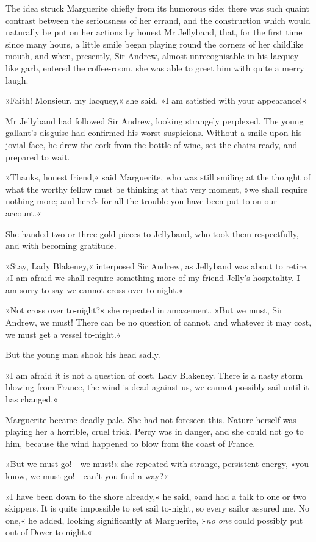 The idea struck Marguerite chiefly from its humorous side: there was such quaint contrast between the seriousness of her errand, and the construction which would naturally be put on her actions by honest Mr Jellyband, that, for the first time since many hours, a little smile began playing round the corners of her childlike mouth, and when, presently, Sir Andrew, almost unrecognisable in his lacquey-like garb, entered the coffee-room, she was able to greet him with quite a merry laugh.

»Faith! Monsieur, my lacquey,« she said, »I am satisfied with your appearance!«

Mr Jellyband had followed Sir Andrew, looking strangely perplexed. The young gallant's disguise had confirmed his worst suspicions. With\-out a smile upon his jovial face, he drew the cork from the bottle of wine, set the chairs ready, and prepared to wait.

»Thanks, honest friend,« said Marguerite, who was still smiling at the thought of what the worthy fellow must be thinking at that very moment, »we shall require nothing more; and here's for all the trouble you have been put to on our account.«

She handed two or three gold pieces to Jellyband, who took them respectfully, and with becoming gratitude.

»Stay, Lady Blakeney,« interposed Sir Andrew, as Jellyband was about to retire, »I am afraid we shall require something more of my friend Jelly's hospitality. I am sorry to say we cannot cross over to-night.«

»Not cross over to-night?« she repeated in amazement. »But we must, Sir Andrew, we must! There can be no question of cannot, and whatever it may cost, we must get a vessel to-night.«

But the young man shook his head sadly.

»I am afraid it is not a question of cost, Lady Blakeney. There is a nasty storm blowing from France, the wind is dead against us, we cannot possibly sail until it has changed.«

Marguerite became deadly pale. She had not foreseen this. Nature herself was playing her a horrible, cruel trick. Percy was in danger, and she could not go to him, because the wind happened to blow from the coast of France.

»But we must go!—we must!« she repeated with strange, persistent energy, »you know, we must go!—can't you find a way?«

»I have been down to the shore already,« he said, »and had a talk to one or two skippers. It is quite impossible to set sail to-night, so every sailor assured me. No one,« he added, looking significantly at Marguerite, »\textit{no one} could possibly put out of Dover to-night.«

